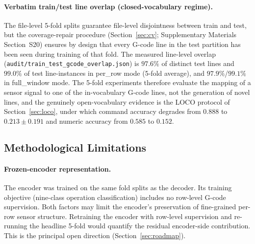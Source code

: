 \documentclass[sensors,article,submit,moreauthors,pdftex]{Definitions/mdpi}
\begin{document}
\paragraph{Verbatim train/test line overlap (closed-vocabulary regime).} The file-level 5-fold splits guarantee file-level disjointness between train and test, but the coverage-repair procedure (Section~\ref{sec:cv}; Supplementary Materials Section~S20) ensures by design that every G-code line in the test partition has been seen during training of that fold. The measured line-level overlap (\texttt{audit/train\_test\_gcode\_overlap.json}) is $97.6\%$ of distinct test lines and $99.0\%$ of test line-instances in per\_row mode (5-fold average), and $97.9\%$/$99.1\%$ in full\_window mode. The 5-fold experiments therefore evaluate the mapping of a sensor signal to one of the in-vocabulary G-code lines, not the generation of novel lines, and the genuinely open-vocabulary evidence is the LOCO protocol of Section~\ref{sec:loco}, under which command accuracy degrades from $0.888$ to $0.213 \pm 0.191$ and numeric accuracy from $0.585$ to $0.152$.

\subsection{Methodological Limitations}
\label{sec:lim-method}

\paragraph{Frozen-encoder representation.} The encoder was trained on the same fold splits as the decoder. Its training objective (nine-class operation classification) includes no row-level G-code supervision. Both factors may limit the encoder's preservation of fine-grained per-row sensor structure. Retraining the encoder with row-level supervision and re-running the headline 5-fold would quantify the residual encoder-side contribution. This is the principal open direction (Section~\ref{sec:roadmap}).
\end{document}
